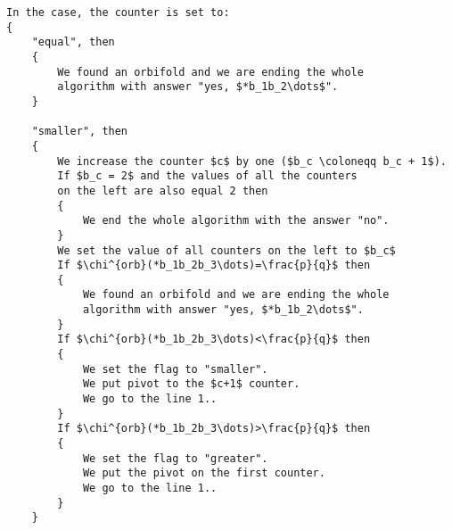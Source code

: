 \begin{lstlisting}[firstnumber=1,consecutivenumbers=true]
In the case, the counter is set to:
{
    "equal", then 
    {
        We found an orbifold and we are ending the whole
        algorithm with answer "yes, $*b_1b_2\dots$".
    }

    "smaller", then 
    {
        We increase the counter $c$ by one ($b_c \coloneqq b_c + 1$).
        If $b_c = 2$ and the values of all the counters 
        on the left are also equal 2 then
        {
            We end the whole algorithm with the answer "no".
        }
        We set the value of all counters on the left to $b_c$
        If $\chi^{orb}(*b_1b_2b_3\dots)=\frac{p}{q}$ then
        {
            We found an orbifold and we are ending the whole
            algorithm with answer "yes, $*b_1b_2\dots$".
        }
        If $\chi^{orb}(*b_1b_2b_3\dots)<\frac{p}{q}$ then
        {
            We set the flag to "smaller".
            We put pivot to the $c+1$ counter.
            We go to the line 1..
        }
        If $\chi^{orb}(*b_1b_2b_3\dots)>\frac{p}{q}$ then  
        {
            We set the flag to "greater".
            We put the pivot on the first counter. 
            We go to the line 1..
        }  
    }


\end{lstlisting}
